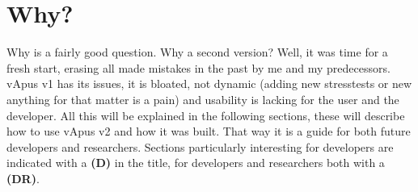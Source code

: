 \section{Why?}
Why is a fairly good question. Why a second version? Well, it was time for a fresh start, erasing all made mistakes in the past by me and my predecessors.
vApus v1 has its issues, it is bloated, not dynamic (adding new stresstests or new anything for that matter is a pain) and usability is lacking for the user and the developer.
 All this will be explained in the following sections, these will describe how to use vApus v2 and how it was built. That way it is a guide for both future developers and researchers.
Sections particularly interesting for developers are indicated with a {\bf(D)} in the title, for developers and  researchers both with a {\bf(DR)}.